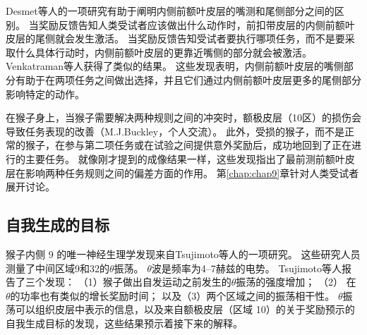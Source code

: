 Desmet等人\cite{desmet2011errors}的一项研究有助于阐明内侧前额叶皮层的嘴测和尾侧部分之间的区别。
当奖励反馈告知人类受试者应该做出什么动作时，前扣带皮层的内侧前额叶皮层的尾侧就会发生激活。
当奖励反馈告知受试者要执行哪项任务，而不是要采取什么具体行动时，内侧前额叶皮层的更靠近嘴侧的部分就会被激活。
Venkatraman等人\cite{venkatraman2009resolving}获得了类似的结果。
这些发现表明，内侧前额叶皮层的嘴侧部分有助于在两项任务之间做出选择，并且它们通过内侧前额叶皮层更多的尾侧部分影响特定的动作。\par


在猴子身上，当猴子需要解决两种规则之间的冲突时，额极皮层（10区）的损伤会导致任务表现的改善（M.J.Buckley，个人交流）。
此外，受损的猴子，而不是正常的猴子，在参与第二项任务或在试验之间提供意外奖励后，成功地回到了正在进行的主要任务。
就像刚才提到的成像结果一样，这些发现指出了最前测前额叶皮层在影响两种任务规则之间的偏差方面的作用。
第\ref{chap:chap9}章针对人类受试者展开讨论。\par



\subsection{自我生成的目标}

猴子内侧 9 的唯一神经生理学发现来自Tsujimoto等人\cite{tsujimoto2006direct}的一项研究。
这些研究人员测量了中间区域9和32的$\theta$振荡。
$ \theta $波是频率为4–7赫兹的电势。
Tsujimoto等人报告了三个发现：
（1）猴子做出自发运动之前发生的$ \theta $振荡的强度增加；
（2） 在 $\theta$的功率也有类似的增长奖励时间；
以及（3）两个区域之间的振荡相干性。
$ \theta $振荡可以组织皮层中表示的信息，以及来自额极皮层（区域 10）的关于奖励预示的自我生成目标的发现，这些结果预示着接下来的解释。\par


